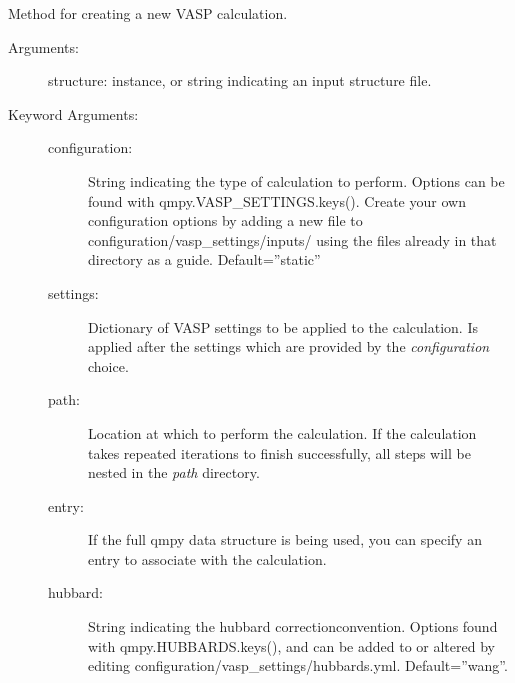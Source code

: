 \documentclass[letterpaper,10pt,english]{sphinxmanual}
\begin{document}
\begin{fulllineitems}
\begin{fulllineitems}
\begin{description}
\end{description}

\end{fulllineitems}


\begin{fulllineitems}
\label{models:qmpy.Calculation.setup}
Method for creating a new VASP calculation.
\begin{description}
\item[{Arguments:}] \leavevmode
structure: {\hyperref[models:qmpy.Structure]{}} instance, or string indicating an
input structure file.

\item[{Keyword Arguments:}] \leavevmode\begin{description}
\item[{configuration: }] \leavevmode
String indicating the type of calculation to
perform. Options can be found with qmpy.VASP\_SETTINGS.keys().
Create your own configuration options by adding a new file to
configuration/vasp\_settings/inputs/ using the files already in
that directory as a guide. Default=''static''

\item[{settings:}] \leavevmode
Dictionary of VASP settings to be applied to the calculation.
Is applied after the settings which are provided by the
\emph{configuration} choice.

\item[{path: }] \leavevmode
Location at which to perform the calculation. If the
calculation takes repeated iterations to finish successfully,
all steps will be nested in the \emph{path} directory.

\item[{entry:}] \leavevmode
If the full qmpy data structure is being used, you can specify
an entry to associate with the calculation.

\item[{hubbard:}] \leavevmode
String indicating the hubbard correctionconvention. Options 
found with qmpy.HUBBARDS.keys(), and can be added to or
altered by editing configuration/vasp\_settings/hubbards.yml.
Default=''wang''.


\end{description}
\end{description}
\end{fulllineitems}
\end{fulllineitems}
\end{document}

